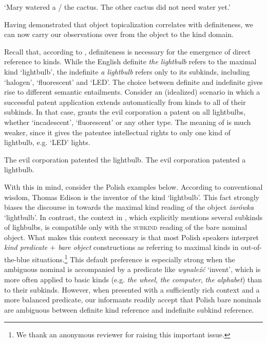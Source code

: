 \documentclass[output=paper,
colorlinks,
citecolor=brown,
newtxmath
]{langscibook}
\begin{document}
\glt `Mary watered a / the cactus. The other cactus did not need water yet.'\\ \label{ex:cactus_2}

\z\z

\noindent
Having demonstrated that object topicalization correlates with definiteness, we can now carry our observations over from the object to the kind domain.

Recall that, according to \citet{Borik.Espinal2012, Borik.Espinal2015}, definiteness is necessary for the emergence of direct reference to kinds. While the English definite \textit{the lightbulb} refers to the maximal kind `lightbulb', the indefinite \textit{a lightbulb} refers only to its subkinds, including `halogen', `fluorescent' and `LED'. The choice between definite and indefinite gives rise to different semantic entailments. Consider an (idealized) scenario in which a successful patent application extends automatically from kinds to all of their subkinds. In that case,  grants the evil corporation a patent on all lightbulbs, whether `incadescent', `fluorescent' or any other type. The meaning of  is much weaker, since it gives the patentee intellectual rights to only one kind of lightbulb, e.g. `LED' lights.

\ea \label{ex:lightbulb_eng}
\ea The evil corporation patented the lightbulb. \label{ex:lightbulb_eng_1}
\ex The evil corporation patented a lightbulb.\label{ex:lightbulb_eng_2}
\z \z

\noindent
With this in mind, consider the Polish examples below. According to conventional wisdom, Thomas Edison is the inventor of the kind `lightbulb'. This fact strongly biases the discourse in  towards the maximal kind reading of the object \textit{żarówka} `lightbulb'. In contrast, the context in , which explicitly mentions several subkinds of lighbulbs, is compatible only with the \textsc{subkind} reading of the bare nominal object. What makes this context necessary is that most Polish speakers interpret \textit{kind predicate $+$ bare object} constructions as referring to maximal kinds in out-of-the-blue situations.\footnote{We thank an anonymous reviewer for raising this important issue.} This default preference is especially strong when the ambiguous nominal is accompanied by a predicate like \textit{wynaleźć} `invent', which is more often applied to basic kinds (e.g. \textit{the wheel}, \textit{the computer}, \textit{the alphabet}) than to their subkinds. However, when presented with a sufficiently rich context and a more balanced predicate, our informants readily accept that Polish bare nominals are ambiguous between definite kind reference and indefinite subkind reference.
\end{document}
